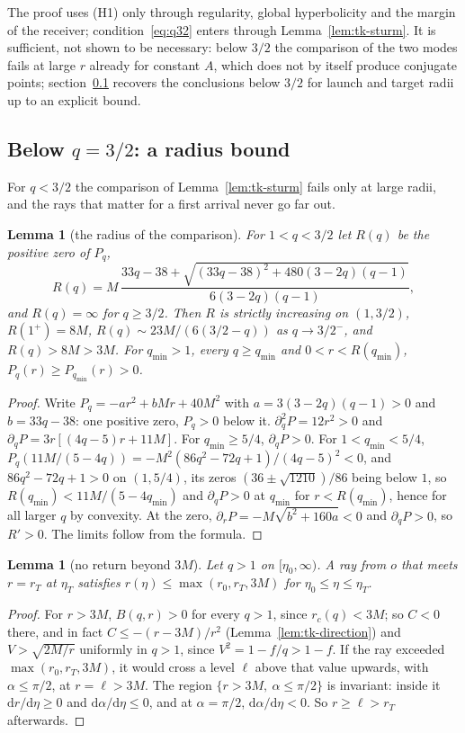 \documentclass[aip,jmp,amsmath,amssymb,reprint]{revtex4-2}
\newcommand{\dd}{\mathrm{d}}
\theoremstyle{plain}
\newtheorem{lemma}[proposition]{Lemma}
\theoremstyle{definition}
\begin{document}
The proof uses (H1) only through regularity, global hyperbolicity and the margin of the
receiver; condition~\eqref{eq:q32} enters through Lemma~\ref{lem:tk-sturm}. It is sufficient, not
shown to be necessary: below $3/2$ the comparison of the two modes fails at large $r$ already for
constant $A$, which does not by itself produce conjugate points; section~\ref{sec:angle-radius}
recovers the conclusions below $3/2$ for launch and target radii up to an explicit bound.
\subsection{Below \texorpdfstring{$q=3/2$}{q=3/2}: a radius bound}
\label{sec:angle-radius}
For $q<3/2$ the comparison of Lemma~\ref{lem:tk-sturm} fails only at large radii, and the rays
that matter for a first arrival never go far out.

\begin{lemma}[the radius of the comparison]\label{lem:radius}
For $1<q<3/2$ let $R(q)$ be the positive zero of $P_q$,
\[
  R(q)=M\,\frac{33q-38+\sqrt{(33q-38)^2+480(3-2q)(q-1)}}{6(3-2q)(q-1)},
\]
and $R(q)=\infty$ for $q\ge3/2$. Then $R$ is strictly increasing on $(1,3/2)$, $R(1^+)=8M$,
$R(q)\sim23M/(6(3/2-q))$ as $q\to3/2^-$, and $R(q)>8M>3M$. For $q_{\min}>1$, every $q\ge q_{\min}$ and
$0<r<R(q_{\min})$, $P_q(r)\ge P_{q_{\min}}(r)>0$.
\end{lemma}

\begin{proof}
Write $P_q=-a r^2+bMr+40M^2$ with $a=3(3-2q)(q-1)>0$ and $b=33q-38$: one positive zero, $P_q>0$ below
it. $\partial_q^2P=12r^2>0$ and $\partial_qP=3r[(4q-5)r+11M]$. For $q_{\min}\ge5/4$, $\partial_qP>0$. For
$1<q_{\min}<5/4$, $P_q(11M/(5-4q))=-M^2(86q^2-72q+1)/(4q-5)^2<0$, and $86q^2-72q+1>0$ on $(1,5/4)$, its zeros $(36\pm\sqrt{1210})/86$ being below $1$, so
$R(q_{\min})<11M/(5-4q_{\min})$ and $\partial_qP>0$ at $q_{\min}$ for $r<R(q_{\min})$, hence for all larger $q$ by
convexity. At the zero, $\partial_rP=-M\sqrt{b^2+160a}<0$ and $\partial_qP>0$, so $R'>0$. The limits follow from
the formula.
\end{proof}

\begin{lemma}[no return beyond $3M$]\label{lem:no-return}
Let $q>1$ on $[\eta_0,\infty)$. A ray from $o$ that meets $r=r_T$ at $\eta_T$ satisfies
$r(\eta)\le\max(r_0,r_T,3M)$ for $\eta_0\le\eta\le\eta_T$.
\end{lemma}

\begin{proof}
For $r>3M$, $B(q,r)>0$ for every $q>1$, since $r_c(q)<3M$; so $C<0$ there, and in fact
$C\le-(r-3M)/r^2$ (Lemma~\ref{lem:tk-direction}) and $V>\sqrt{2M/r}$ uniformly in $q>1$, since $V^2=1-f/q>1-f$. If the ray exceeded
$\max(r_0,r_T,3M)$, it would cross a level $\ell$ above that value upwards, with $\alpha\le\pi/2$, at
$r=\ell>3M$. The region $\{r>3M,\ \alpha\le\pi/2\}$ is invariant: inside it $\dd r/\dd\eta\ge0$ and
$\dd\alpha/\dd\eta\le0$, and at $\alpha=\pi/2$, $\dd\alpha/\dd\eta<0$. So $r\ge\ell>r_T$ afterwards.
\end{proof}
\end{document}
